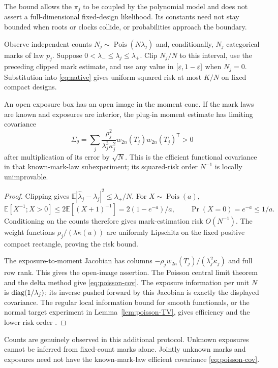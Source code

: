 The bound allows the $\pi_j$ to be coupled by the polynomial model and does not assert a full-dimensional fixed-design likelihood. Its constants need not stay bounded when roots or clocks collide, or probabilities approach the boundary.

\begin{theorem}\label{thm:poisson}
Observe independent counts $N_j\sim\operatorname{Pois}(N\lambda_j)$ and, conditionally, $N_j$ categorical marks of law $p_j$. Suppose $0<\lambda_-\le\lambda_j\le\lambda_+$. Clip $N_j/N$ to this interval, use the preceding clipped mark estimate, and use any value in $[\varepsilon,1-\varepsilon]$ when $N_j=0$. Substitution into \eqref{eq:native} gives uniform squared risk at most $K/N$ on fixed compact designs.

An open exposure box has an open image in the moment cone. If the mark laws are known and exposures are interior, the plug-in moment estimate has limiting covariance
\begin{equation}\label{eq:poisson-cov}
 \Sigma_\theta=\sum_j\frac{\rho_j^2}{\lambda_j^3\kappa_j^2}
          w_{2n}(T_j)w_{2n}(T_j)^{\mathsf T}>0
\end{equation}
after multiplication of its error by $\sqrt N$. This is the efficient functional covariance in that known-mark-law subexperiment; its squared-risk order $N^{-1}$ is locally unimprovable.
\end{theorem}
\begin{proof}
Clipping gives $\mathbb E|\widehat\lambda_j-\lambda_j|^2\le\lambda_+/N$. For $X\sim\operatorname{Pois}(a)$,
\[
 \mathbb E[X^{-1};X>0]\le2\mathbb E[(X+1)^{-1}]
       =2(1-e^{-a})/a,\qquad\Pr(X=0)=e^{-a}\le1/a.
\]
Conditioning on the counts therefore gives mark-estimation risk $O(N^{-1})$. The weight functions $\rho_j/(\lambda\kappa(u))$ are uniformly Lipschitz on the fixed positive compact rectangle, proving the risk bound.

The exposure-to-moment Jacobian has columns $-\rho_jw_{2n}(T_j)/(\lambda_j^2\kappa_j)$ and full row rank. This gives the open-image assertion. The Poisson central limit theorem and the delta method give \eqref{eq:poisson-cov}. The exposure information per unit $N$ is $\operatorname{diag}(1/\lambda_j)$; its inverse pushed forward by this Jacobian is exactly the displayed covariance. The regular local information bound for smooth functionals, or the normal target experiment in Lemma~\ref{lem:poisson-TV}, gives efficiency and the lower risk order \cite{vdV}.
\end{proof}
Counts are genuinely observed in this additional protocol. Unknown exposures cannot be inferred from fixed-count marks alone. Jointly unknown marks and exposures need not have the known-mark-law efficient covariance \eqref{eq:poisson-cov}.


